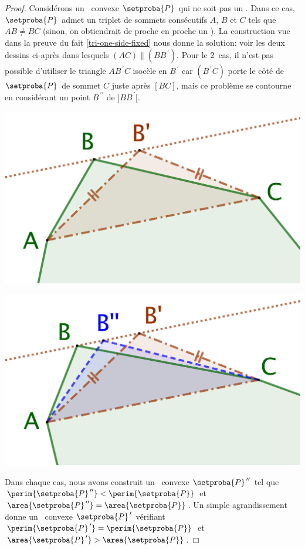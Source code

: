 \begin{proof}
	Considérons un \ngone\ convexe $\setproba{P}$ qui ne soit pas un \niso.
	Dans ce cas, $\setproba{P}$ admet un triplet de sommets consécutifs $A$, $B$ et $C$ tels que $AB \neq BC$ (sinon, on obtiendrait de proche en proche un \niso).
	La construction vue dans la preuve du fait \ref{tri-one-side-fixed} nous donne la solution: voir les deux dessins ci-après dans lesquels $(AC) \parallel (BB^{\,\prime})$. 
	Pour le 2\ieme\ cas, il n'est pas possible d'utiliser le triangle $AB^{\,\prime}C$ isocèle en $B^{\,\prime}$ car $(B^{\,\prime}C)$ porte le côté de $\setproba{P}$ de sommet $C$ juste après $[BC]$, mais ce problème se contourne en considérant un point $B^{\,\prime\prime}$ de $]BB^{\,\prime}[$.
	\begin{multicols}{2}
		\centering

		\includegraphics[scale=.4]{content/polygon/necessary-cond/not-iso-OK.png}

		\includegraphics[scale=.4]{content/polygon/necessary-cond/not-iso-KO.png}
	\end{multicols}
	
	Dans chaque cas, nous avons construit un \ngone\ convexe $\setproba{P}^{\,\prime\prime}$ tel que 
	$\perim{\setproba{P}^{\,\prime\prime}} < \perim{\setproba{P}}$ 
	et 
	$\area{\setproba{P}^{\,\prime\prime}} = \area{\setproba{P}}$.
	Un simple agrandissement donne un \ngone\ convexe $\setproba{P}^{\,\prime}$ vérifiant
	$\perim{\setproba{P}^{\,\prime}} = \perim{\setproba{P}}$ 
	et 
	$\area{\setproba{P}^{\,\prime}} > \area{\setproba{P}}$.
\end{proof}


